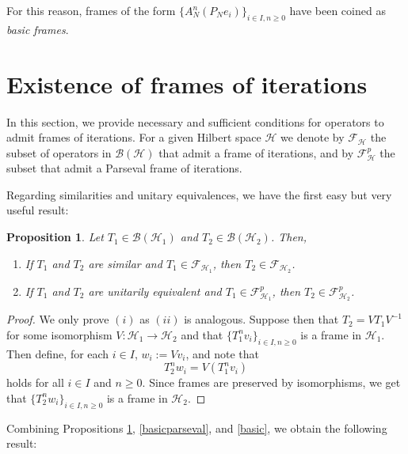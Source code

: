 \documentclass[a4paper,12pt]{amsart}
\def\cB{{\mathcal{B}}}
\def\cF{{\mathcal{F}}}
\def\HH{{\mathcal{H}}}
\def\cF{{\mathcal{F}}}
\newtheorem{proposition}[theorem]{Proposition}
\theoremstyle{definition}
\begin{document}
For this reason, frames of the form $\{A_N^n(P_Ne_i)\}_{i\in I,n\geqslant0}$ have been coined as {\em basic frames}.

\section{Existence of frames of iterations }\label{proofs}
In this section, we provide necessary and sufficient conditions for operators to admit frames of iterations.
For a given Hilbert space $\HH$ we denote by $\cF_\HH$ the subset of operators in $\cB(\HH)$ that admit a frame of iterations, and by $\cF^{p}_\HH$ the subset that admit a Parseval frame of iterations. 

Regarding similarities and unitary equivalences, we have the first easy but very useful result:

\begin{proposition}\label{similares}
Let $T_1\in\cB(\HH_1)$ and $T_2\in\cB(\HH_2)$. Then,
\begin{enumerate}[label=(\roman*),ref=(\roman*)]
\item If $T_1$ and $T_2$ are similar and $T_1\in\cF_{\HH_1}$, then $T_2\in\cF_{\HH_2}$.

\item If $T_1$ and $T_2$ are  unitarily equivalent and $T_1\in\cF^p_{\HH_1}$, then $T_2\in\cF^p_{\HH_2}$.
\end{enumerate}
\end{proposition}
\begin{proof}
We only prove $(i)$ as $(ii)$ is analogous. Suppose then that $T_2=VT_1V^{-1}$ for some isomorphism $V:\HH_1\to\HH_2$ and that $\{T_1^nv_i\}_{i\in I,n\geqslant0}$ is a frame in $\HH_1$. Then define, for each $i\in I$, $w_i:=Vv_i$, and note that
\begin{equation*}
T_2^nw_i=V(T_1^nv_i)
\end{equation*}
holds for all $i\in I$ and $n\geqslant0$. Since frames are preserved by isomorphisms, we get that $\{T_2^nw_i\}_{i\in I,n\geqslant0}$ is a frame in $\HH_2$.
\end{proof}

Combining Propositions \ref{similares}, \ref{basicparseval}, and \ref{basic}, we obtain the following result:
\end{document}
